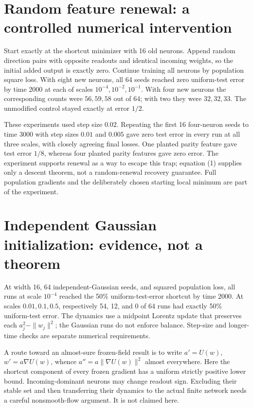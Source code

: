 \documentclass[11pt]{article}
\begin{document}
\section{Random feature renewal: a controlled numerical intervention}
Start exactly at the shortcut minimizer with 16 old neurons. Append
random direction pairs with opposite readouts and identical incoming
weights, so the initial added output is exactly zero. Continue training
all neurons by population square loss. With eight new neurons, all 64
seeds reached zero uniform-test error by time 2000 at each of scales
$10^{-4},10^{-2},10^{-1}$. With four new neurons the corresponding
counts were $56,59,58$ out of 64; with two they were $32,32,33$.
The unmodified control stayed exactly at error $1/2$.

These experiments used step size $0.02$. Repeating the first 16
four-neuron seeds to time 3000 with step sizes $0.01$ and $0.005$
gave zero test error in every run at all three scales, with closely
agreeing final losses. One planted parity feature gave test error
$1/8$, whereas four planted parity features gave zero error. The
experiment supports renewal as a way to escape this trap; equation
(1) supplies only a descent theorem, not a random-renewal recovery
guarantee. Full population gradients and the deliberately chosen
starting local minimum are part of the experiment.

\section{Independent Gaussian initialization: evidence, not a theorem}
At width 16, 64 independent-Gaussian seeds, and squared population
loss, all runs at scale $10^{-4}$ reached the 50\% uniform-test-error
shortcut by time 2000. At scales $0.01,0.1,0.5$, respectively
54, 12, and 0 of 64 runs had exactly 50\% uniform-test error.
The dynamics use a midpoint Lorentz update that preserves each
$a_j^2-\|w_j\|^2$; the Gaussian runs do not enforce balance.
Step-size and longer-time checks are separate numerical requirements.

A route toward an almost-sure frozen-field result is to write
$a'=U(w)$, $w'=a\nabla U(w)$, whence
$a''=a\|\nabla U(w)\|^2$ almost everywhere. Here the shortcut component
of every frozen gradient has a uniform strictly positive lower bound.
Incoming-dominant neurons may change readout sign. Excluding their
stable set and then transferring their dynamics to the actual finite
network needs a careful nonsmooth-flow argument. It is not claimed here.
\end{document}
